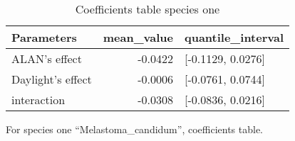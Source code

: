 \documentclass[
]{article}
\begin{document}
\begin{table}

\caption{\label{tab:unnamed-chunk-21}Coefficients table species one}
\centering
\begin{tabular}[t]{l|r|>{}l}
\hline
Parameters & mean\_value & quantile\_interval\\
\hline
ALAN's effect & -0.0422 & [-0.1129, 0.0276]\\
\hline
Daylight's effect & -0.0006 & [-0.0761, 0.0744]\\
\hline
interaction & -0.0308 & [-0.0836, 0.0216]\\
\hline
\end{tabular}
\end{table}

For species one ``Melastoma\_candidum'', coefficients table.
\end{document}
